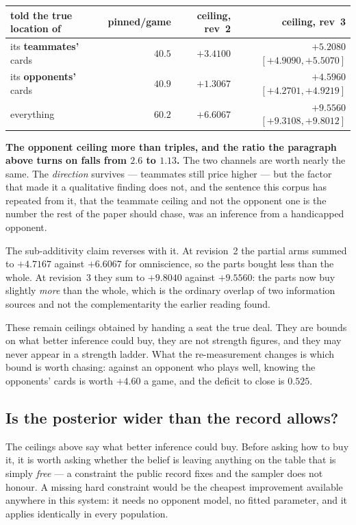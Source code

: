 \documentclass[11pt,letterpaper]{article}
\begin{document}
\begin{center}
\small
\begin{tabular}{lrrr}
\toprule
told the true location of & pinned/game & ceiling, rev~2 & ceiling, rev~3 \\
\midrule
its \textbf{teammates'} cards & $40.5$ & $+3.4100$ & $\mathbf{+5.2080}$ $[+4.9090, +5.5070]$ \\
its \textbf{opponents'} cards & $40.9$ & $+1.3067$ & $\mathbf{+4.5960}$ $[+4.2701, +4.9219]$ \\
everything & $60.2$ & $+6.6067$ & $\mathbf{+9.5560}$ $[+9.3108, +9.8012]$ \\
\bottomrule
\end{tabular}
\end{center}

\noindent \textbf{The opponent ceiling more than triples, and the ratio the
paragraph above turns on falls from $2.6$ to $\mathbf{1.13}$.} The two
channels are worth nearly the same. The \emph{direction} survives --- teammates
still price higher --- but the factor that made it a qualitative finding does
not, and the sentence this corpus has repeated from it, that the teammate
ceiling and not the opponent one is the number the rest of the paper should
chase, was an inference from a handicapped opponent.

The sub-additivity claim reverses with it. At revision~2 the partial arms summed
to $+4.7167$ against $+6.6067$ for omniscience, so the parts bought less than
the whole. At revision~3 they sum to $+9.8040$ against $+9.5560$: the parts now
buy slightly \emph{more} than the whole, which is the ordinary overlap of two
information sources and not the complementarity the earlier reading found.

These remain ceilings obtained by handing a seat the true deal. They are bounds
on what better inference could buy, they are not strength figures, and they may
never appear in a strength ladder. What the re-measurement changes is which
bound is worth chasing: against an opponent who plays well, knowing the
opponents' cards is worth $+4.60$ a game, and the deficit to close is $0.525$.

\subsection{Is the posterior wider than the record allows?}
\label{sec:res-legality}
The ceilings above say what better inference could buy. Before asking how to
buy it, it is worth asking whether the belief is leaving anything on the table
that is simply \emph{free} --- a constraint the public record fixes and the
sampler does not honour. A missing hard constraint would be the cheapest
improvement available anywhere in this system: it needs no opponent model, no
fitted parameter, and it applies identically in every population.
\end{document}
